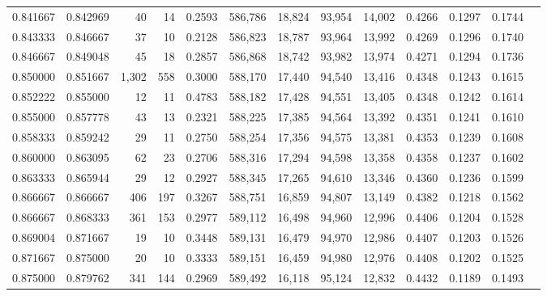 \begin{tabular}{rrrrrrrrrrrrr}
0.841667 & 0.842969 &     40 &     14 &                                     0.2593 & 586,786 &  18,824 &  93,954 &  14,002 & 0.4266 & 0.1297 & 0.1744 \\
0.843333 & 0.846667 &     37 &     10 &                                     0.2128 & 586,823 &  18,787 &  93,964 &  13,992 & 0.4269 & 0.1296 & 0.1740 \\
0.846667 & 0.849048 &     45 &     18 &                                     0.2857 & 586,868 &  18,742 &  93,982 &  13,974 & 0.4271 & 0.1294 & 0.1736 \\
0.850000 & 0.851667 &  1,302 &    558 &                                     0.3000 & 588,170 &  17,440 &  94,540 &  13,416 & 0.4348 & 0.1243 & 0.1615 \\
0.852222 & 0.855000 &     12 &     11 &                                     0.4783 & 588,182 &  17,428 &  94,551 &  13,405 & 0.4348 & 0.1242 & 0.1614 \\
0.855000 & 0.857778 &     43 &     13 &                                     0.2321 & 588,225 &  17,385 &  94,564 &  13,392 & 0.4351 & 0.1241 & 0.1610 \\
0.858333 & 0.859242 &     29 &     11 &                                     0.2750 & 588,254 &  17,356 &  94,575 &  13,381 & 0.4353 & 0.1239 & 0.1608 \\
0.860000 & 0.863095 &     62 &     23 &                                     0.2706 & 588,316 &  17,294 &  94,598 &  13,358 & 0.4358 & 0.1237 & 0.1602 \\
0.863333 & 0.865944 &     29 &     12 &                                     0.2927 & 588,345 &  17,265 &  94,610 &  13,346 & 0.4360 & 0.1236 & 0.1599 \\
0.866667 & 0.866667 &    406 &    197 &                                     0.3267 & 588,751 &  16,859 &  94,807 &  13,149 & 0.4382 & 0.1218 & 0.1562 \\
0.866667 & 0.868333 &    361 &    153 &                                     0.2977 & 589,112 &  16,498 &  94,960 &  12,996 & 0.4406 & 0.1204 & 0.1528 \\
0.869004 & 0.871667 &     19 &     10 &                                     0.3448 & 589,131 &  16,479 &  94,970 &  12,986 & 0.4407 & 0.1203 & 0.1526 \\
0.871667 & 0.875000 &     20 &     10 &                                     0.3333 & 589,151 &  16,459 &  94,980 &  12,976 & 0.4408 & 0.1202 & 0.1525 \\
0.875000 & 0.879762 &    341 &    144 &                                     0.2969 & 589,492 &  16,118 &  95,124 &  12,832 & 0.4432 & 0.1189 & 0.1493 \\

\end{tabular}
